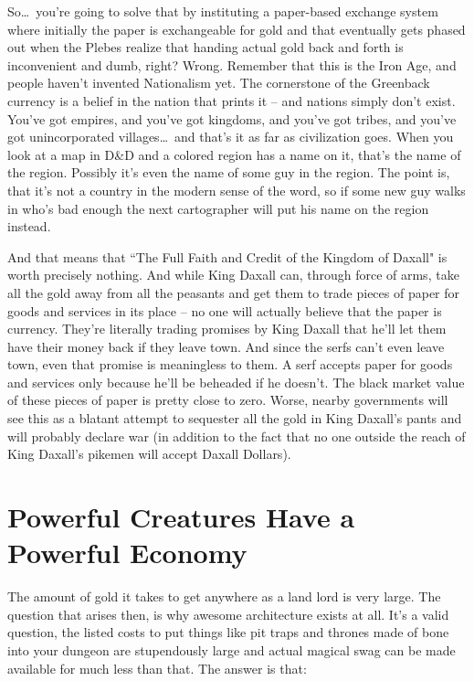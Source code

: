 So\ldots\  you're going to solve that by instituting a paper-based exchange system where initially the paper is exchangeable for gold and that eventually gets phased out when the Plebes realize that handing actual gold back and forth is inconvenient and dumb, right? Wrong. Remember that this is the Iron Age, and people haven't invented Nationalism yet. The cornerstone of the Greenback currency is a belief in the nation that prints it -- and nations simply don't exist. You've got empires, and you've got kingdoms, and you've got tribes, and you've got unincorporated villages\ldots\  and that's it as far as civilization goes. When you look at a map in D\&D and a colored region has a name on it, that's the name of the region. Possibly it's even the name of some guy in the region. The point is, that it's not a country in the modern sense of the word, so if some new guy walks in who's bad enough the next cartographer will put his name on the region instead.

And that means that ``The Full Faith and Credit of the Kingdom of Daxall" is worth precisely nothing. And while King Daxall can, through force of arms, take all the gold away from all the peasants and get them to trade pieces of paper for goods and services in its place -- no one will actually believe that the paper is currency. They're literally trading promises by King Daxall that he'll let them have their money back if they leave town. And since the serfs can't even leave town, even that promise is meaningless to them. A serf accepts paper for goods and services only because he'll be beheaded if he doesn't. The black market value of these pieces of paper is pretty close to zero. Worse, nearby governments will see this as a blatant attempt to sequester all the gold in King Daxall's pants and will probably declare war (in addition to the fact that no one outside the reach of King Daxall's pikemen will accept Daxall Dollars).

\section{Powerful Creatures Have a Powerful Economy}

The amount of gold it takes to get anywhere as a land lord is very large. The question that arises then, is why awesome architecture exists at all. It's a valid question, the listed costs to put things like pit traps and thrones made of bone into your dungeon are stupendously large and actual magical swag can be made available for much less than that. The answer is that:

